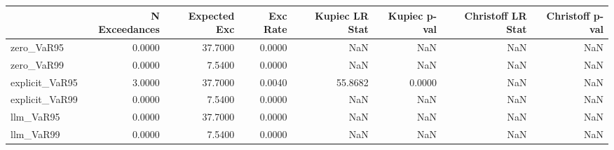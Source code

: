 \begin{tabular}{lrrrrrrr}
\toprule
 & N Exceedances & Expected Exc & Exc Rate & Kupiec LR Stat & Kupiec p-val & Christoff LR Stat & Christoff p-val \\
\midrule
zero_VaR95 & 0.0000 & 37.7000 & 0.0000 & NaN & NaN & NaN & NaN \\
zero_VaR99 & 0.0000 & 7.5400 & 0.0000 & NaN & NaN & NaN & NaN \\
explicit_VaR95 & 3.0000 & 37.7000 & 0.0040 & 55.8682 & 0.0000 & NaN & NaN \\
explicit_VaR99 & 0.0000 & 7.5400 & 0.0000 & NaN & NaN & NaN & NaN \\
llm_VaR95 & 0.0000 & 37.7000 & 0.0000 & NaN & NaN & NaN & NaN \\
llm_VaR99 & 0.0000 & 7.5400 & 0.0000 & NaN & NaN & NaN & NaN \\
\bottomrule
\end{tabular}
